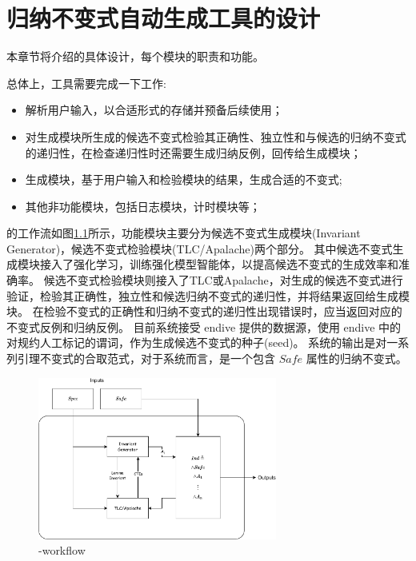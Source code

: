 \chapter{归纳不变式自动生成工具的设计}\label{chap:design}

本章节将介绍\rltla 的具体设计，每个模块的职责和功能。

总体上，工具需要完成一下工作:
\begin{itemize}
    \item 解析用户输入，以合适形式的存储并预备后续使用；
    \item 对生成模块所生成的候选不变式检验其正确性、独立性和与候选的归纳不变式的递归性，在检查递归性时还需要生成归纳反例，回传给生成模块；
    \item 生成模块，基于用户输入和检验模块的结果，生成合适的不变式;
    \item 其他非功能模块，包括日志模块，计时模块等；
\end{itemize}

\rltla 的工作流如图\ref{fig:rltla}所示，功能模块主要分为候选不变式生成模块(Invariant Generator)，候选不变式检验模块(TLC/Apalache)两个部分。
其中候选不变式生成模块接入了强化学习，训练强化模型智能体，以提高候选不变式的生成效率和准确率。
候选不变式检验模块则接入了TLC或Apalache，对生成的候选不变式进行验证，检验其正确性，独立性和候选归纳不变式的递归性，并将结果返回给生成模块。
在检验不变式的正确性和归纳不变式的递归性出现错误时，应当返回对应的不变式反例和归纳反例。
目前系统接受 endive 提供的数据源，使用 endive 中的对规约人工标记的谓词，作为生成候选不变式的种子(seed)。
系统的输出是对一系列引理不变式的合取范式，对于系统而言，是一个包含 $Safe$ 属性的归纳不变式。

\begin{figure}[h]
    \centering
    \includegraphics[width=0.7\textwidth]{figures/workflow.pdf}
    \caption{\rltla -workflow}
    \label{fig:rltla}
\end{figure}

